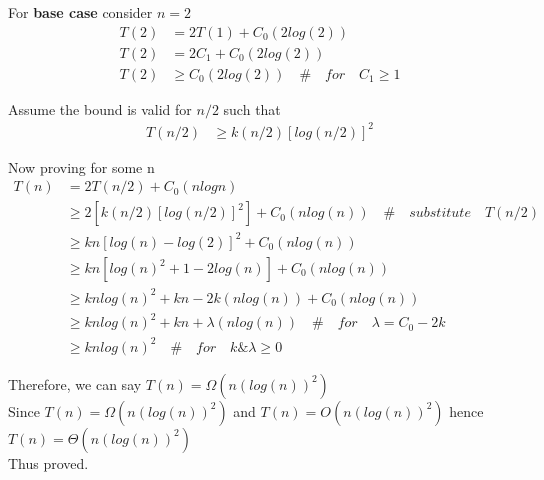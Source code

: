 \documentclass[12pt]{article}
\begin{document}
For \textbf{base case} consider \(n=2\)
\begin{equation}
\begin{aligned}
\nonumber
T(2)&=2T(1) + C_0(2log(2)) \\
T(2)&=2C_1 + C_0(2log(2)) \\
T(2)& \ge C_0(2log(2)) \quad \# \quad for \quad C_1 \ge 1
\end{aligned}
\end{equation}

Assume the bound is valid for \(n/2\) such that 
\begin{equation}
\begin{aligned}
\nonumber
T(n/2)& \ge k(n/2)[log(n/2)]^2
\end{aligned}
\end{equation}

Now proving for some n 
\begin{equation}
\begin{aligned}
\nonumber
T(n)&=2T(n/2)+C_0(nlogn) \\
& \ge 2[k(n/2)[log(n/2)]^2]+C_0(nlog(n)) \quad \# \quad substitute \quad T(n/2)  \\
& \ge kn[log(n) - log(2)]^2+C_0(nlog(n)) \\ 
& \ge kn[log(n)^2+1-2log(n)]+C_0(nlog(n)) \\ 
& \ge knlog(n)^2 +kn -2k(nlog(n))+C_0(nlog(n)) \\
& \ge knlog(n)^2 +kn + \lambda(nlog(n)) \quad \# \quad for \quad \lambda=C_0-2k \\
& \ge knlog(n)^2 \quad \# \quad for \quad k \& \lambda \ge 0
\end{aligned}
\end{equation}

Therefore, we can say \(T(n)=\Omega(n(log(n))^2)\) \\
Since \(T(n)=\Omega(n(log(n))^2)\) and \(T(n)=O(n(log(n))^2)\)  hence  
\(T(n)=\Theta(n(log(n))^2)\) \\ 
Thus proved.
\end{document}
